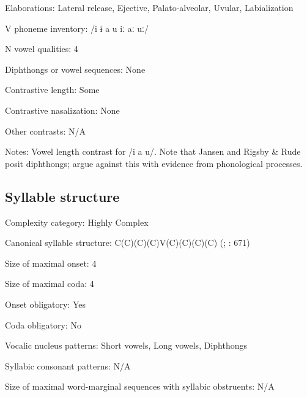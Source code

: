 {\begin{appendixdesc}
\item[Elaborations:] Lateral release, Ejective, Palato-alveolar, Uvular, Labialization

\item[V phoneme inventory:] /i ɨ a u iː aː uː/

\item[N vowel qualities:] 4

\item[Diphthongs or vowel sequences:] None

\item[Contrastive length:] Some

\item[Contrastive nasalization:] None

\item[Other contrasts:] N/A

\item[Notes:] Vowel length contrast for /i a u/. Note that Jansen and Rigsby \& Rude posit diphthongs; \citet{HargusBeavert2006} argue against this with evidence from phonological processes.
\end{appendixdesc}
\subsection*{Syllable structure}
\begin{appendixdesc}

\item[Complexity category:] Highly Complex

\item[Canonical syllable structure:] C(C)(C)(C)V(C)(C)(C)(C) (\citealt{HargusBeavert2006,HargusBeavert2002}; \citealt{RigsbyRude1996}: 671)

\item[Size of maximal onset:] 4

\item[Size of maximal coda:] 4

\item[Onset obligatory:] Yes

\item[Coda obligatory:] No

\item[Vocalic nucleus patterns:] Short vowels, Long vowels, Diphthongs

\item[Syllabic consonant patterns:] N/A

\item[Size of maximal word-marginal sequences with syllabic obstruents:] N/A


\end{appendixdesc}}
